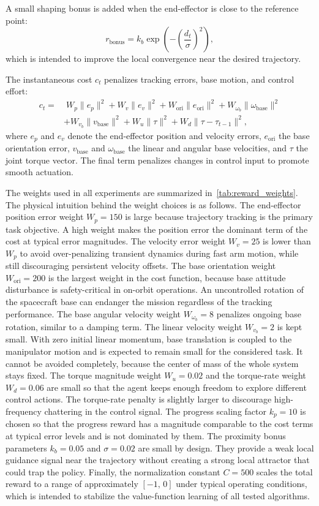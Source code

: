 \documentclass{ieeeaccess}
\begin{document}
A small shaping bonus is added when the end-effector is close to the reference
point:
\begin{equation}
r_{\mathrm{bonus}} = k_b \exp\!\left(-\left(\frac{d_t}{\sigma}\right)^2\right),
\end{equation}
which is intended to improve the local convergence near the desired trajectory.

The instantaneous cost $c_t$ penalizes tracking errors, base motion, and control effort:
\begin{align}
c_t =&\;
W_p \|e_p\|^2
+ W_v \|e_v\|^2
+ W_{\mathrm{ori}} \|e_{\mathrm{ori}}\|^2
+ W_{\omega_b} \|\omega_{\mathrm{base}}\|^2 \nonumber \\
&+ W_{v_b} \|v_{\mathrm{base}}\|^2
+ W_u \|\tau\|^2
+ W_d \|\tau - \tau_{t-1}\|^2 ,
\end{align}
where $e_p$ and $e_v$ denote the end-effector position and velocity errors, $e_{\mathrm{ori}}$ the base
orientation error, $v_{\mathrm{base}}$ and $\omega_{\mathrm{base}}$ the linear 
and angular base velocities, and $\tau$ the joint torque vector. The final term penalizes
changes in control input to promote smooth actuation.

The weights used in all experiments are summarized in~\cref{tab:reward_weights}. The physical intuition
behind the weight choices is as follows. The end-effector position error weight $W_p = 150$ is large
because trajectory tracking is the primary task objective. A high weight makes the position error the
dominant term of the cost at typical error magnitudes. The velocity error weight $W_v = 25$ is lower than
$W_p$ to avoid over-penalizing transient dynamics during fast arm motion, while still discouraging
persistent velocity offsets. The base orientation weight $W_{\mathrm{ori}} = 200$ is the largest weight
in the cost function, because base attitude disturbance is safety-critical in on-orbit operations. An
uncontrolled rotation of the spacecraft base can endanger the mission regardless of the tracking
performance. The base angular velocity weight $W_{\omega_b} = 8$ penalizes ongoing base rotation, similar
to a damping term. The linear velocity weight $W_{v_b} = 2$ is kept small. With zero initial linear
momentum, base translation is coupled to the manipulator motion and is expected to remain small for the
considered task. It cannot be avoided completely, because the center of mass of the whole system stays
fixed. The torque magnitude weight $W_u = 0.02$ and the torque-rate weight $W_d = 0.06$ are small so that
the agent keeps enough freedom to explore different control actions. The torque-rate penalty is slightly
larger to discourage high-frequency chattering in the control signal. The progress scaling factor
$k_p = 10$ is chosen so that the progress reward has a magnitude comparable to the cost terms at
typical error levels and is not dominated by them. The proximity bonus parameters $k_b = 0.05$ and
$\sigma = 0.02$ are small by design. They provide a weak local guidance signal near the trajectory
without creating a strong local attractor that could trap the policy. Finally, the normalization constant
$C = 500$ scales the total reward to a range of approximately $[-1,\, 0]$ under typical operating
conditions, which is intended to stabilize the value-function learning of all tested algorithms.
\end{document}
